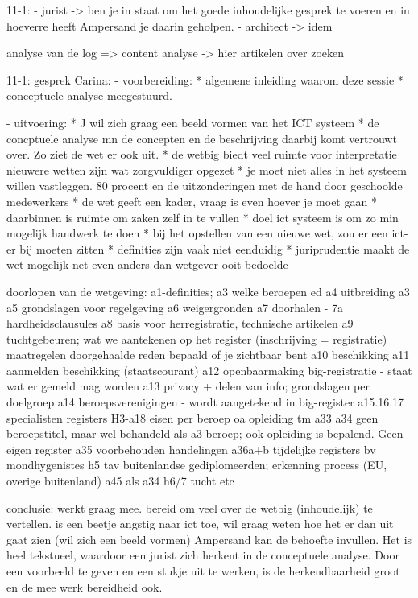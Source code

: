 11-1:
- jurist -> ben je in staat om het goede inhoudelijke gesprek te voeren en in hoeverre heeft Ampersand je daarin geholpen.
- architect -> idem

analyse van de log => content analyse -> hier artikelen over zoeken


11-1: gesprek Carina:
- voorbereiding:
* algemene inleiding waarom deze sessie
* conceptuele analyse meegestuurd.

- uitvoering:
* J wil zich graag een beeld vormen van het ICT systeem
* de concptuele analyse mn de concepten en de beschrijving daarbij komt vertrouwt over. Zo ziet de wet er ook uit.
* de wetbig biedt veel ruimte voor interpretatie
    nieuwere wetten zijn wat zorgvuldiger opgezet
* je moet niet alles in het systeem willen vastleggen. 80 procent en de uitzonderingen met de hand door geschoolde medewerkers
* de wet geeft een kader, vraag is even hoever je moet gaan
* daarbinnen is ruimte om zaken zelf in te vullen
* doel ict systeem is om zo min mogelijk handwerk te doen
* bij het opstellen van een nieuwe wet, zou er een ict-er bij moeten zitten
* definities zijn vaak niet eenduidig
* juriprudentie maakt de wet mogelijk net even anders dan wetgever ooit bedoelde

doorlopen van de wetgeving:
a1-definities; 
a3 welke beroepen ed
a4 uitbreiding a3
a5 grondslagen voor regelgeving
a6 weigergronden
a7 doorhalen - 7a hardheidsclausules
a8 basis voor herregistratie, technische artikelen
a9 tuchtgebeuren; wat we aantekenen op het register
(inschrijving = registratie)
maatregelen
doorgehaalde reden bepaald of je zichtbaar bent 
a10 beschikking
a11 aanmelden beschikking (staatscourant)
a12 openbaarmaking big-registratie - staat wat er gemeld mag worden
a13 privacy + delen van info; grondslagen per doelgroep
a14 beroepsverenigingen - wordt aangetekend in big-register
a15.16.17 specialisten registers
H3-a18 eisen per beroep oa opleiding
tm a33
a34 geen beroepstitel, maar wel behandeld als a3-beroep; ook opleiding is bepalend. Geen eigen register
a35 voorbehouden handelingen
a36a+b tijdelijke registers bv mondhygenistes
h5 tav buitenlandse gediplomeerden; erkenning process (EU, overige buitenland)
a45 als a34
h6/7 tucht
etc

conclusie: 
werkt graag mee. bereid om veel over de wetbig (inhoudelijk) te vertellen.
is een beetje angstig naar ict toe, wil graag weten hoe het er dan uit gaat zien (wil zich een beeld vormen)
Ampersand kan de behoefte invullen. Het is heel tekstueel, waardoor een jurist zich herkent in de conceptuele analyse.
Door een voorbeeld te geven en een stukje uit te werken, is de herkendbaarheid groot en de mee werk bereidheid ook.
